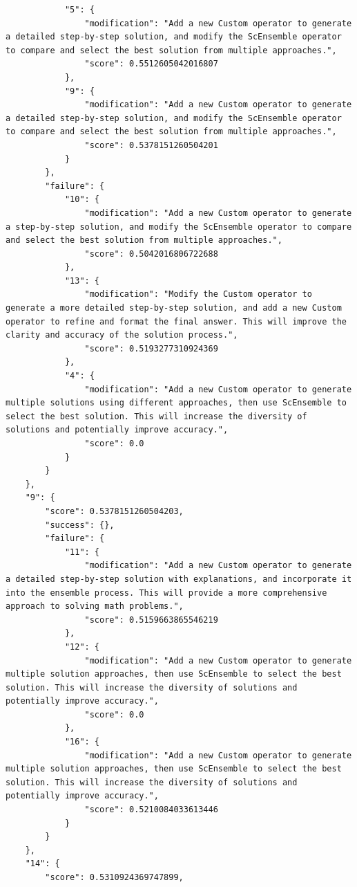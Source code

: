 \begin{tcolorbox}
\begin{verbatim}
            "5": {
                "modification": "Add a new Custom operator to generate a detailed step-by-step solution, and modify the ScEnsemble operator to compare and select the best solution from multiple approaches.",
                "score": 0.5512605042016807
            },
            "9": {
                "modification": "Add a new Custom operator to generate a detailed step-by-step solution, and modify the ScEnsemble operator to compare and select the best solution from multiple approaches.",
                "score": 0.5378151260504201
            }
        },
        "failure": {
            "10": {
                "modification": "Add a new Custom operator to generate a step-by-step solution, and modify the ScEnsemble operator to compare and select the best solution from multiple approaches.",
                "score": 0.5042016806722688
            },
            "13": {
                "modification": "Modify the Custom operator to generate a more detailed step-by-step solution, and add a new Custom operator to refine and format the final answer. This will improve the clarity and accuracy of the solution process.",
                "score": 0.5193277310924369
            },
            "4": {
                "modification": "Add a new Custom operator to generate multiple solutions using different approaches, then use ScEnsemble to select the best solution. This will increase the diversity of solutions and potentially improve accuracy.",
                "score": 0.0
            }
        }
    },
    "9": {
        "score": 0.5378151260504203,
        "success": {},
        "failure": {
            "11": {
                "modification": "Add a new Custom operator to generate a detailed step-by-step solution with explanations, and incorporate it into the ensemble process. This will provide a more comprehensive approach to solving math problems.",
                "score": 0.5159663865546219
            },
            "12": {
                "modification": "Add a new Custom operator to generate multiple solution approaches, then use ScEnsemble to select the best solution. This will increase the diversity of solutions and potentially improve accuracy.",
                "score": 0.0
            },
            "16": {
                "modification": "Add a new Custom operator to generate multiple solution approaches, then use ScEnsemble to select the best solution. This will increase the diversity of solutions and potentially improve accuracy.",
                "score": 0.5210084033613446
            }
        }
    },
    "14": {
        "score": 0.5310924369747899,

\end{verbatim}
\end{tcolorbox}
